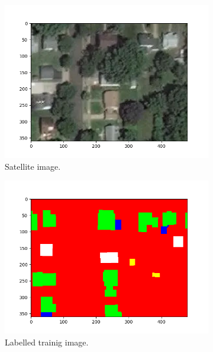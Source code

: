 \documentclass[fleqn,10pt]{SelfArx} %
\begin{document}
\begin{figure}[ht]\centering %
\begin{subfigure}{.33\textwidth}
  \centering
  \includegraphics[width= \linewidth]{minnesota1.png}
  \caption{Satellite image.}
\end{subfigure}%
\begin{subfigure}{.33\textwidth}
  \centering
  \includegraphics[width= \linewidth]{minnesota2.png}
  \caption{Labelled trainig image.}
\end{subfigure}%
\begin{subfigure}{.33\textwidth}
  \centering

\end{subfigure}
\end{figure}
\end{document}

